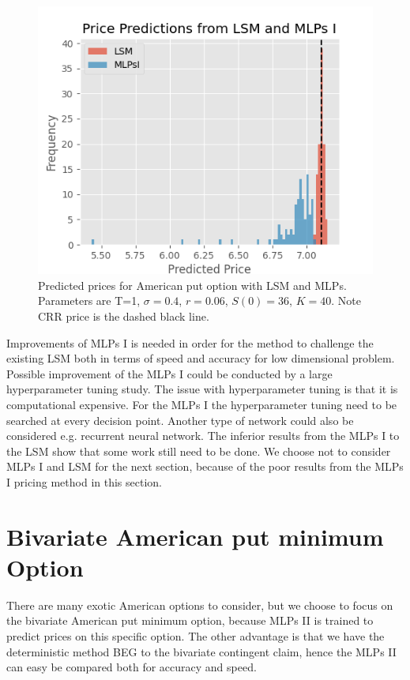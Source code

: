 \begin{figure}[H]
\centering
\includegraphics{Figures/histLSMMLPsI.png}
\decoRule
\caption[Histogram Price Predictions]{Predicted prices for American put option with LSM and MLPs. Parameters are T=1, $\sigma=0.4$, $r=0.06$, $S(0)=36$, $K=40$. Note CRR price is the dashed black line.}
\label{fig:histLSMMLPsI}
\end{figure}

Improvements of MLPs I is needed in order for the method to challenge the existing LSM both in terms of speed and accuracy for low dimensional problem. Possible improvement of the MLPs I could be conducted by a large hyperparameter tuning study. The issue with hyperparameter tuning is that it is computational expensive. For the MLPs I the hyperparameter tuning need to be searched at every decision point. Another type of network could also be considered e.g. recurrent neural network. The inferior results from the MLPs I to the LSM show that some work still need to be done. We choose not to consider MLPs I and LSM for the next section, because of the poor results from the MLPs I pricing method in this section.\\
\section{Bivariate American put minimum Option}\label{bivariateAmerPut}
There are many exotic American options to consider, but we choose to focus on the bivariate American put minimum option, because MLPs II is trained to predict prices on this specific option. The other advantage is that we have the deterministic method BEG to the bivariate contingent claim, hence the MLPs II can easy be compared both for accuracy and speed.\\

